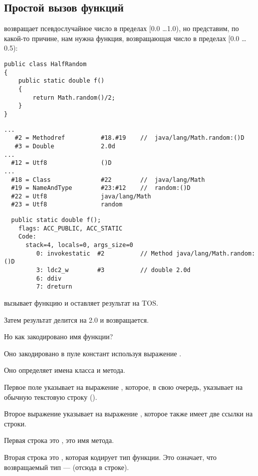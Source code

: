 \subsection{Простой вызов функций}


 возвращает псевдослучайное число в пределах [0.0 \dots 1.0), но представим,
по какой-то причине, нам нужна функция, возвращающая число в пределах [0.0 \dots 0.5):

\begin{lstlisting}
public class HalfRandom
{ 
	public static double f()
	{
		return Math.random()/2;
	}
}
\end{lstlisting}

\begin{lstlisting}[caption=Constant pool]
...
   #2 = Methodref          #18.#19    //  java/lang/Math.random:()D
   #3 = Double             2.0d
...
  #12 = Utf8               ()D
...
  #18 = Class              #22        //  java/lang/Math
  #19 = NameAndType        #23:#12    //  random:()D
  #22 = Utf8               java/lang/Math
  #23 = Utf8               random
\end{lstlisting}

\begin{lstlisting}
  public static double f();
    flags: ACC_PUBLIC, ACC_STATIC
    Code:
      stack=4, locals=0, args_size=0
         0: invokestatic  #2          // Method java/lang/Math.random:()D
         3: ldc2_w        #3          // double 2.0d
         6: ddiv          
         7: dreturn       
\end{lstlisting}


 вызывает функцию  и оставляет результат на \ac{TOS}.

Затем результат делится на 2.0 и возвращается.

Но как закодировано имя функции?

Оно закодировано в пуле констант используя выражение .

Оно определяет имена класса и метода.

Первое поле  указывает на выражение , которое, в свою очередь,
указывает на обычную текстовую строку ().

Второе выражение  указывает на выражение , которое также
имеет две ссылки на строки.

Первая строка это , это имя метода.

Вторая строка это , которая кодирует тип функции. Это означает, что возвращаемый тип ---  (отсюда  в строке).

